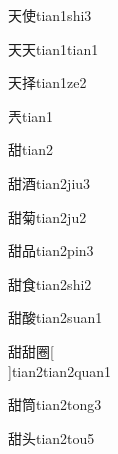 \begin{verbete}[4;8]{天使}{tian1shi3}
\end{verbete}

\begin{verbete}[4;4]{天天}{tian1tian1}
\end{verbete}

\begin{verbete}[4;8]{天择}{tian1ze2}
\end{verbete}

\begin{verbete}[6]{兲}{tian1}
\end{verbete}

\begin{verbete}[11]{甜}{tian2}
\end{verbete}

\begin{verbete}[11;10]{甜酒}{tian2jiu3}
\end{verbete}

\begin{verbete}[11;11]{甜菊}{tian2ju2}
\end{verbete}

\begin{verbete}[11;9]{甜品}{tian2pin3}
\end{verbete}

\begin{verbete}[11;9]{甜食}{tian2shi2}
\end{verbete}

\begin{verbete}[11;14]{甜酸}{tian2suan1}
\end{verbete}

\begin{verbete}[11;11;11]{甜甜圈}[\\]{tian2tian2quan1}
\end{verbete}

\begin{verbete}[11;12]{甜筒}{tian2tong3}
\end{verbete}

\begin{verbete}[11;5]{甜头}{tian2tou5}
\end{verbete}

